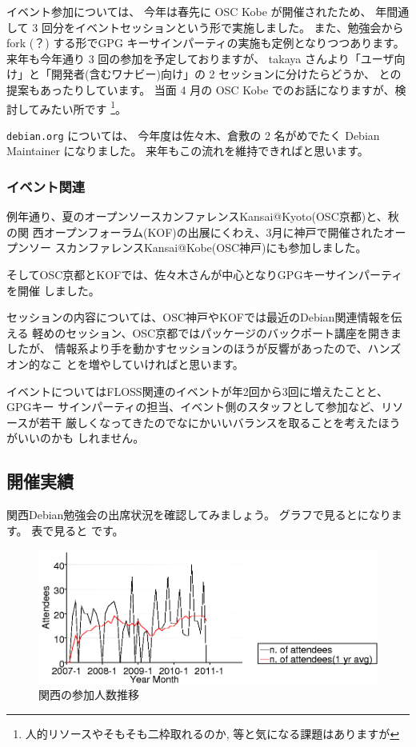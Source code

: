 \documentclass[mingoth,a4paper]{jsarticle}
\begin{document}
イベント参加については、%
今年は春先に OSC Kobe が開催されたため、%
年間通して 3 回分をイベントセッションという形で実施しました。
%
また、勉強会から fork (？) する形でGPG キーサインパーティの実施も定例となりつつあります。
来年も今年通り 3 回の参加を予定しておりますが、%
takaya さんより「ユーザ向け」と「開発者(含むワナビー)向け」の 2 セッションに分けたらどうか、%
との提案もあったりしています。%
当面 4 月の OSC Kobe でのお話になりますが、検討してみたい所です%
\footnote{人的リソースやそもそも二枠取れるのか, 等と気になる課題はありますが}。

{\tt{debian.org}} については、
今年度は佐々木、倉敷の 2 名がめでたく Debian Maintainer になりました。
来年もこの流れを維持できればと思います。

\subsubsection{イベント関連}

例年通り、夏のオープンソースカンファレンスKansai@Kyoto(OSC京都)と、秋の関
西オープンフォーラム(KOF)の出展にくわえ、3月に神戸で開催されたオープンソー
スカンファレンスKansai@Kobe(OSC神戸)にも参加しました。

そしてOSC京都とKOFでは、佐々木さんが中心となりGPGキーサインパーティを開催
しました。

セッションの内容については、OSC神戸やKOFでは最近のDebian関連情報を伝える
軽めのセッション、OSC京都ではパッケージのバックポート講座を開きましたが、
情報系より手を動かすセッションのほうが反響があったので、ハンズオン的なこ
とを増やしていければと思います。

イベントについてはFLOSS関連のイベントが年2回から3回に増えたことと、GPGキー
サインパーティの担当、イベント側のスタッフとして参加など、リソースが若干
厳しくなってきたのでなにかいいバランスを取ることを考えたほうがいいのかも
しれません。


\subsection{開催実績}

関西Debian勉強会の出席状況を確認してみましょう。
グラフで見るとになります。
表で見ると です。

\begin{figure}[h]
 \begin{center}
  \includegraphics[width=1\hsize]{image201012/memberanalysis/kansai.png}
 \end{center}
\caption{関西の参加人数推移}
\label{fig:kansaipeoplechart}
\end{figure}
\end{document}
